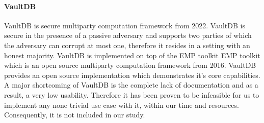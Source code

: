 \paragraph{VaultDB} 
VaultDB \cite{rogers2022vaultdb} is secure multiparty computation framework from 2022. VaultDB is secure in the presence of a passive adversary and supports two parties of which the adversary can corrupt at most one, therefore it resides in a setting with an honest majority. VaultDB is implemented on top of the EMP toolkit EMP toolkit \cite{emp-toolkit} which is an open source multiparty computation framework from 2016. VaultDB provides an open source implementation which demonstrates it's core capabilities.
A major shortcoming of VaultDB is the complete lack of documentation and as a result, a very low usability. Therefore it has been proven to be infeasible for us to implement any none trivial use case with it, within our time and resources. Consequently, it is not included in our study.

 
